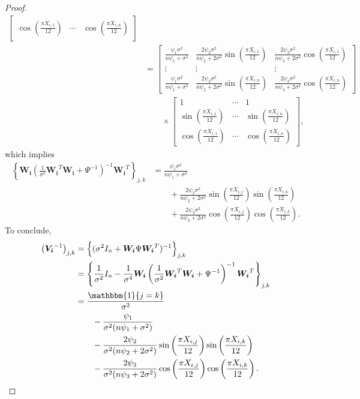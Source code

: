 \begin{proof}
\begin{align*}
\begin{bmatrix}
    \cos\left(\frac{\pi X_{i,1}}{12}\right) & \cdots & \cos\left(\frac{\pi X_{i,n}}{12}\right)   \end{bmatrix} \\
    &= \begin{bmatrix}\frac{\psi_1\sigma^2}{n\psi_1+\sigma^2} & \frac{2\psi_2\sigma^2}{n\psi_2+2\sigma^2}\sin\left(\frac{\pi X_{i,1}}{12}\right) & \frac{2\psi_3\sigma^2}{n\psi_3+2\sigma^2}\cos\left(\frac{\pi X_{i,1}}{12}\right) \\
    \vdots & \vdots & \vdots \\
    \frac{\psi_1\sigma^2}{n\psi_1+\sigma^2} & \frac{2\psi_2\sigma^2}{n\psi_2+2\sigma^2}\sin\left(\frac{\pi X_{i,n}}{12}\right) & \frac{2\psi_3\sigma^2}{n\psi_3+2\sigma^2}\cos\left(\frac{\pi X_{i,n}}{12}\right) \end{bmatrix} \\
    & \quad \quad \times \begin{bmatrix}
    1 & \cdots & 1 \\ 
    \sin\left(\frac{\pi X_{i,1}}{12}\right) & \cdots & \sin\left(\frac{\pi X_{i,n}}{12}\right) \\ 
    \cos\left(\frac{\pi X_{i,1}}{12}\right) & \cdots & \cos\left(\frac{\pi X_{i,n}}{12}\right)   \end{bmatrix},
\end{align*}
which implies
\begin{align*}
\left\{\boldsymbol{W_i}\left(\frac{1}{\sigma^2}\boldsymbol{W_i}^T\boldsymbol{W_i}+\Psi^{-1}\right)^{-1}\boldsymbol{W_i}^T \right\}_{j,k} &= \frac{\psi_1\sigma^2}{n\psi_1+\sigma^2} \\
& \quad \quad + \frac{2\psi_2\sigma^2}{n\psi_2+2\sigma^2}\sin\left(\frac{\pi X_{i,j}}{12}\right)\sin\left(\frac{\pi X_{i,k}}{12}\right) \\
& \quad \quad + \frac{2\psi_3\sigma^2}{n\psi_3+2\sigma^2}\cos\left(\frac{\pi X_{i,j}}{12}\right)\cos\left(\frac{\pi X_{i,k}}{12}\right).
\end{align*}
To conclude,
\begin{align*}
 \left(\boldsymbol{V_i}^{-1}\right)_{j,k} &= \left\{(\sigma^2I_{n} + \boldsymbol{W_i}\Psi \boldsymbol{W_i}^T)^{-1}\right\}_{j,k} \\
    &= \left\{\frac{1}{\sigma^2}I_{n} - \frac{1}{\sigma^4}\boldsymbol{W_i}\left(\frac{1}{\sigma^2}\boldsymbol{W_i}^T\boldsymbol{W_i}+\Psi^{-1}\right)^{-1}\boldsymbol{W_i}^T\right\}_{j,k} \\
    &= \frac{\mathbbm{1}\{j=k\}}{\sigma^2} \\
    &\quad \quad - \frac{\psi_1}{\sigma^2(n\psi_1+\sigma^2)} \\
    & \quad \quad - \frac{2\psi_2}{\sigma^2(n\psi_2+2\sigma^2)}\sin\left(\frac{\pi X_{i,j}}{12}\right)\sin\left(\frac{\pi X_{i,k}}{12}\right) \\
    &\quad \quad - \frac{2\psi_3}{\sigma^2(n\psi_3+2\sigma^2)}\cos\left(\frac{\pi X_{i,j}}{12}\right)\cos\left(\frac{\pi X_{i,k}}{12}\right).
\end{align*}
\end{proof}
